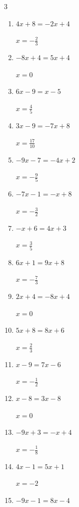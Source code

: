 \begin{multicols}{3}
\begin{enumerate}
  \item $4x+8=-2x+4$

        $\displaystyle x=-\frac{2}{3}$

  \item $-8x+4=5x+4$

        $\displaystyle x=0$

  \item $6x-9=x-5$

        $\displaystyle x=\frac{4}{5}$

  \item $3x-9=-7x+8$

        $\displaystyle x=\frac{17}{10}$

\columnbreak %

  \item $-9x-7=-4x+2$

        $\displaystyle x=-\frac{9}{5}$

  \item $-7x-1=-x+8$

        $\displaystyle x=-\frac{3}{2}$

  \item $-x+6=4x+3$

        $\displaystyle x=\frac{3}{5}$

  \item $6x+1=9x+8$

        $\displaystyle x=-\frac{7}{3}$

  \item $2x+4=-8x+4$

        $\displaystyle x=0$

  \item $5x+8=8x+6$

        $\displaystyle x=\frac{2}{3}$

  \item $x-9=7x-6$

        $\displaystyle x=-\frac{1}{2}$

  \item $x-8=3x-8$

        $\displaystyle x=0$

  \item $-9x+3=-x+4$

        $\displaystyle x=-\frac{1}{8}$

  \item $4x-1=5x+1$

        $\displaystyle x=-2$

  \item $-9x-1=8x-4$


\end{enumerate}
\end{multicols}
